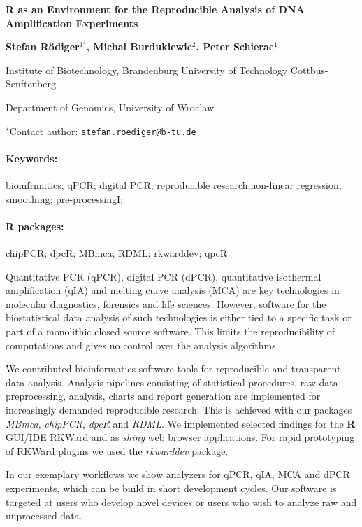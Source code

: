 \documentclass[11pt, a4paper]{article}
\renewcommand{\title}[1]{\begin{center}{\bf \LARGE #1}\end{center}}
\newcommand{\keywords}{\paragraph{Keywords:}}
\newcommand{\packages}{\paragraph{R packages:}}
\begin{document}
\pagestyle{empty}

\title{R as an Environment for the Reproducible Analysis of DNA Amplification
Experiments}

\begin{center}
  {\bf Stefan Rödiger$^{1^\star}$, Michal Burdukiewic$^{2}$, Peter Schierac$^{1}$}
\end{center}

\vskip 0.3cm

\begin{affiliations}
\begin{enumerate}
\begin{minipage}{0.915\textwidth}
\centering
\item Institute of Biotechnology, Brandenburg University of Technology
Cottbus-Senftenberg \\[-2pt]
\item Department of Genomics, University of Wroclaw \\[-2pt]
\end{minipage}
\end{enumerate}
$^\star$Contact author: \href{mailto:stefan.roediger@b-tu.de}{\nolinkurl{stefan.roediger@b-tu.de}}\\
\end{affiliations}

\vskip 0.5cm

\begin{minipage}{0.915\textwidth}
\keywords bioinfrmatics; qPCR; digital PCR; reproducible research;non-linear
regression; smoothing; pre-processingI;
\packages chipPCR; dpcR; MBmca; RDML; rkwarddev; qpcR
\end{minipage}

\vskip 0.8cm

Quantitative PCR (qPCR), digital PCR (dPCR), quantitative isothermal
amplification (qIA) and melting curve analysis (MCA) are key
technologies in molecular diagnostics, forensics and life sciences.
However, software for the biostatistical data analysis of such
technologies is either tied to a specific task or part of a monolithic
closed source software. This limits the reproducibility of computations
and gives no control over the analysis algorithms.

We contributed bioinformatics software tools for reproducible and
transparent data analysis. Analysis pipelines consisting of statistical
procedures, raw data preprocessing, analysis, charts and report
generation are implemented for increasingly demanded reproducible
research. This is achieved with our packages \emph{MBmca},
\emph{chipPCR}, \emph{dpcR} and \emph{RDML}. We implemented selected
findings for the \textbf{R} GUI/IDE RKWard and as \emph{shiny} web
browser applications. For rapid prototyping of RKWard plugins we used
the \emph{rkwarddev} package.

In our exemplary workflows we show analyzers for qPCR, qIA, MCA and dPCR
experiments, which can be build in short development cycles. Our
software is targeted at users who develop novel devices or users who
wish to analyze raw and unprocessed data.
\end{document}
